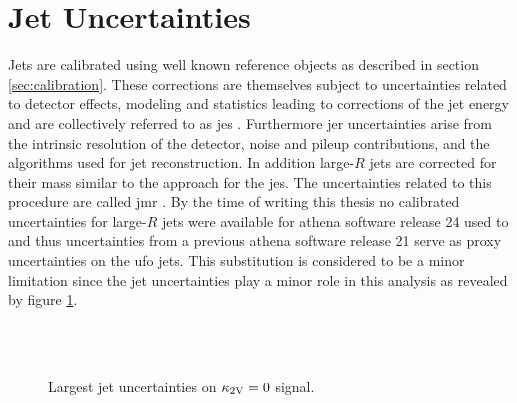 \section{Jet Uncertainties}
Jets are calibrated using well known reference objects as described in section \ref{sec:calibration}. These corrections are themselves subject to uncertainties related to detector effects, modeling and statistics leading to corrections of the jet energy and are collectively referred to as \ac{jes} \citep{atlas2021jet,Aaboud:2019aa}. %
Furthermore \ac{jer} uncertainties arise from the intrinsic resolution of the detector, noise and pileup contributions, and the algorithms used for jet reconstruction. In addition large-$R$ jets are corrected for their mass similar to the approach for the \ac{jes}. The uncertainties related to this procedure are called \ac{jmr} \citep{ATLAS-CONF-2020-022}. By the time of writing this thesis no calibrated uncertainties for large-$R$ jets were available for athena software release 24 used to  and thus uncertainties from a previous athena software release 21 \citep{Athena} serve as proxy uncertainties on the \ac{ufo} jets. This substitution is considered to be a minor limitation since the jet uncertainties play a minor role in this analysis as revealed by figure \ref{fig:jet_uncertainties}.
\begin{figure}
    \centering
    \\
    \\
    \caption[]{Largest jet uncertainties on $\kappa_{\text{2V}}=0$ signal.}
    \label{fig:jet_uncertainties}
\end{figure}


